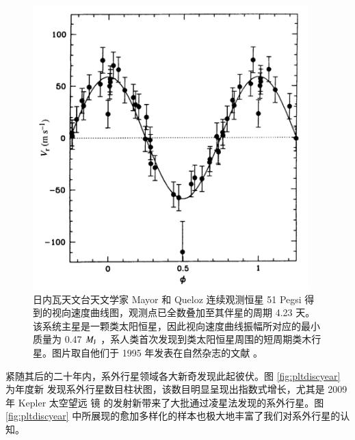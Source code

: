 \begin{figure}[ht]
\centering
\includegraphics[width=0.95\textwidth]{figures/chapter1/fig2_51pegsi.jpg}
\caption[1995 年，日内瓦天文台天文学家 Mayor 和 Queloz 连续观测恒星 51 Pegsi 得到的视向速度曲线图，观测点已全数叠加至其伴星的周期 4.23 天。该系统主星是一颗类太阳恒星，因此视向速度曲线振幅所对应的最小质量为 0.47 $M_\tif{J}$ ，系人类首次发现到类太阳恒星周围的短周期类木行星。]{日内瓦天文台天文学家 Mayor 和 Queloz 连续观测恒星 51 Pegsi 得到的视向速度曲线图，观测点已全数叠加至其伴星的周期 4.23 天。该系统主星是一颗类太阳恒星，因此视向速度曲线振幅所对应的最小质量为 0.47 $M_\tif{J}$ ，系人类首次发现到类太阳恒星周围的短周期类木行星。图片取自他们于 1995 年发表在自然杂志的文献 。}
\label{fig:51pegsi}
\end{figure}

紧随其后的二十年内，系外行星领域各大新奇发现此起彼伏。图 \ref{fig:pltdiscyear} 为年度新
发现系外行星数目柱状图，该数目明显呈现出指数式增长，尤其是 2009 年 Kepler 太空望远
镜\cite{Boruckietal2010} 的发射新带来了大批通过凌星法发现的系外行星。图\ref{fig:pltdiscyear} 
中所展现的愈加多样化的样本也极大地丰富了我们对系外行星的认知。

